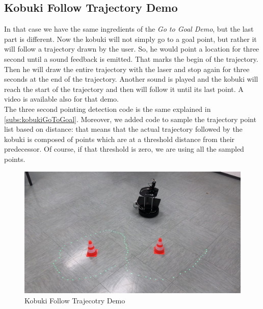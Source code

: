 \subsection{Kobuki Follow Trajectory Demo}
In that case we have the same ingredients of the \emph{Go to Goal Demo}, but the last part is different. Now the kobuki will not simply go to a goal point, but rather it will follow a trajectory drawn by the user. So, he would point a location for three second until a sound feedback is emitted. That marks the begin of the trajectory. Then he will draw the entire trajectory with the laser and stop again for three seconds at the end of the trajectory. Another sound is played and the kobuki will reach the start of the trajectory and then will follow it until its last point. A video is available also for that demo.\\
The three second pointing detection code is the same explained in \ref{subs:kobukiGoToGoal}. Moreover, we added code to sample the trajectory point list based on distance: that means that the actual trajectory followed by the kobuki is composed of points which are at a threshold distance from their predecessor. Of course, if that threshold is zero, we are using all the sampled points.\\

\begin{figure}
	\centering
	\includegraphics[width=\textwidth]{img/followTrajectoryDemo.png}%
	\caption{Kobuki Follow Trajecotry Demo}
	\label{fig:followTrajectoryDemo}
\end{figure}
